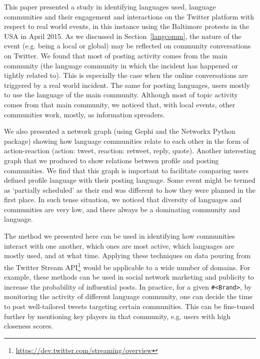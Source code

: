 \documentclass[conference]{IEEEtran}
\begin{document}
This paper presented a study in identifying languages used, language
communities and their engagement and interactions on the Twitter
platform with respect to real world events, in this instance using the
Baltimore protests in the USA in April 2015. As we discussed in
Section~\ref{langcomm}, the nature of the event (e.g. being a local or
global) may be reflected on community conversations on Twitter. We
found that most of posting activity comes from the main community (the
language community in which the incident has happened or tightly
related to). This is especially the case when the online conversations
are triggered by a real world incident. The same for posting
languages, users mostly to use the language of the main
community. Although most of topic activity comes from that main
community, we noticed that, with local events, other communities work,
mostly, as information spreaders.

We also presented a network graph (using Gephi and the Networkx Python
package) showing how language communities relate to each other in the
form of action-reaction (action: tweet, reaction: retweet, reply,
quote). Another interesting graph that we produced to show relations
between profile and posting communities. We find that this graph is
important to facilitate comparing users defined profile language with
their posting language. Some event might be termed as `partially
scheduled' as their end was different to how they were planned in the
first place. In such tense situation, we noticed that diversity of
languages and communities are very low, and there always be a
dominating community and language.

The method we presented here can be used in identifying how
communities interact with one another, which ones are most active,
which languages are mostly used, and at what time. Applying these
techniques on data pouring from the Twitter Stream
API\footnote{\url{https://dev.twitter.com/streaming/overview}} would
be applicable to a wide number of domains. For example, these methods
can be used in social network marketing and publicity to increase the
probability of influential posts. In practice, for a given
{\texttt{\#<Brand>}}, by monitoring the activity of different language
community, one can decide the time to post well-tailored tweets
targeting certain communities. This can be fine-tuned further by
mentioning key players in that community, e.g. users with high
closeness scores.


\end{document}
